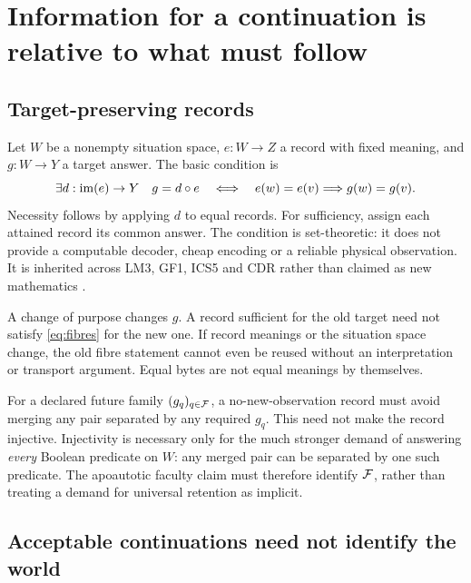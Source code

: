 \section{Information for a continuation is relative to what must follow}
\label{sec:information}

\subsection{Target-preserving records}

Let \(W\) be a nonempty situation space, \(e:W\to Z\) a record with fixed meaning, and \(g:W\to Y\) a target answer. The basic condition is
\begin{equation}
\exists d:\operatorname{im}(e)\to Y\quad g=d\circ e
\quad\Longleftrightarrow\quad
 e(w)=e(v)\Longrightarrow g(w)=g(v).
\label{eq:fibres}
\end{equation}
Necessity follows by applying \(d\) to equal records. For sufficiency, assign each attained record its common answer. The condition is set-theoretic: it does not provide a computable decoder, cheap encoding or a reliable physical observation. It is inherited across LM3, GF1, ICS5 and CDR rather than claimed as new mathematics \cite[\S10.3]{LM3}\cite[\S11]{GF1}\cite[(1)]{ICS}\cite[\S3]{CDR}.

A change of purpose changes \(g\). A record sufficient for the old target need not satisfy \eqref{eq:fibres} for the new one. If record meanings or the situation space change, the old fibre statement cannot even be reused without an interpretation or transport argument. Equal bytes are not equal meanings by themselves.

For a declared future family \((g_q)_{q\in\mathcal F}\), a no-new-observation record must avoid merging any pair separated by any required \(g_q\). This need not make the record injective. Injectivity is necessary only for the much stronger demand of answering \emph{every} Boolean predicate on \(W\): any merged pair can be separated by one such predicate. The apoautotic faculty claim must therefore identify \(\mathcal F\), rather than treating a demand for universal retention as implicit.

\subsection{Acceptable continuations need not identify the world}

